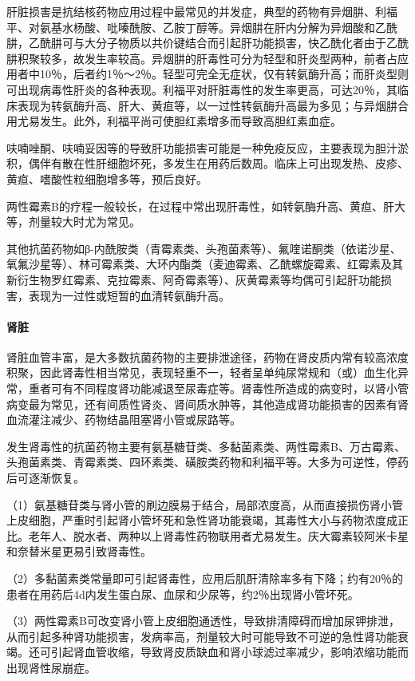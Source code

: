 肝脏损害是抗结核药物应用过程中最常见的并发症，典型的药物有异烟肼、利福平、对氨基水杨酸、吡嗪酰胺、乙胺丁醇等。异烟肼在肝内分解为异烟酸和乙酰肼，乙酰肼可与大分子物质以共价键结合而引起肝功能损害，快乙酰化者由于乙酰肼积聚较多，故发生率较高。异烟肼的肝毒性可分为轻型和肝炎型两种，前者占应用者中10％，后者约1％～2％。轻型可完全无症状，仅有转氨酶升高；而肝炎型则可出现病毒性肝炎的各种表现。利福平对肝脏毒性的发生率更高，可达20％，其临床表现为转氨酶升高、肝大、黄疸等，以一过性转氨酶升高最为多见；与异烟肼合用尤易发生。此外，利福平尚可使胆红素增多而导致高胆红素血症。

呋喃唑酮、呋喃妥因等的导致肝功能损害可能是一种免疫反应，主要表现为胆汁淤积，偶伴有散在性肝细胞坏死，多发生在用药后数周。临床上可出现发热、皮疹、黄疸、嗜酸性粒细胞增多等，预后良好。

两性霉素B的疗程一般较长，在过程中常出现肝毒性，如转氨酶升高、黄疸、肝大等，剂量较大时尤为常见。

其他抗菌药物如β-内酰胺类（青霉素类、头孢菌素等）、氟喹诺酮类（依诺沙星、氧氟沙星等）、林可霉素类、大环内酯类（麦迪霉素、乙酰螺旋霉素、红霉素及其新衍生物罗红霉素、克拉霉素、阿奇霉素等）、灰黄霉素等均偶可引起肝功能损害，表现为一过性或短暂的血清转氨酶升高。
\paragraph{肾脏}

肾脏血管丰富，是大多数抗菌药物的主要排泄途径，药物在肾皮质内常有较高浓度积聚，因此肾毒性相当常见，表现轻重不一，轻者呈单纯尿常规和（或）血生化异常，重者可有不同程度肾功能减退至尿毒症等。肾毒性所造成的病变时，以肾小管病变最为常见，还有间质性肾炎、肾间质水肿等，其他造成肾功能损害的因素有肾血流灌注减少、药物结晶阻塞肾小管或尿路等。

发生肾毒性的抗菌药物主要有氨基糖苷类、多黏菌素类、两性霉素B、万古霉素、头孢菌素类、青霉素类、四环素类、磺胺类药物和利福平等。大多为可逆性，停药后可逐渐恢复。

（1）氨基糖苷类与肾小管的刷边膜易于结合，局部浓度高，从而直接损伤肾小管上皮细胞，严重时引起肾小管坏死和急性肾功能衰竭，其毒性大小与药物浓度成正比。老年人、脱水者、两种以上肾毒性药物联用者尤易发生。庆大霉素较阿米卡星和奈替米星更易引致肾毒性。

（2）多黏菌素类常量即可引起肾毒性，应用后肌酐清除率多有下降；约有20％的患者在用药后4d内发生蛋白尿、血尿和少尿等，约2％出现肾小管坏死。

（3）两性霉素B可改变肾小管上皮细胞通透性，导致排清障碍而增加尿钾排泄，从而引起多种肾功能损害，发病率高，剂量较大时可能导致不可逆的急性肾功能衰竭。还可引起肾血管收缩，导致肾皮质缺血和肾小球滤过率减少，影响浓缩功能而出现肾性尿崩症。

